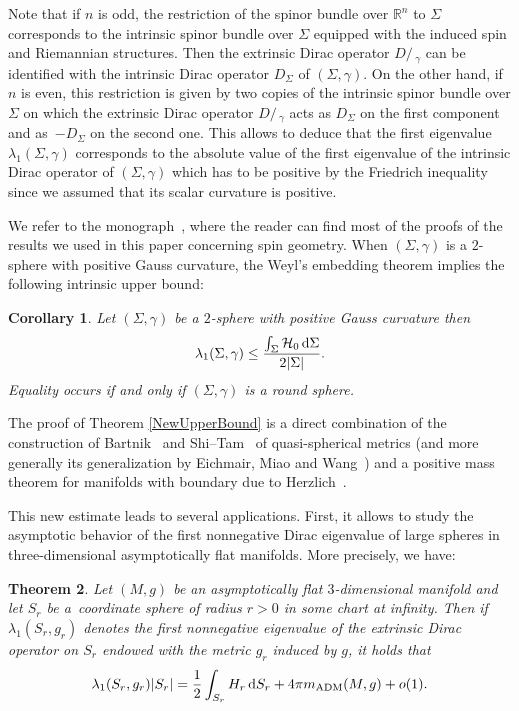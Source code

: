 \documentclass[10pt,a4paper]{amsart}
\numberwithin{equation}{section}
\newtheorem{Theorem}{Theorem}[section]
\newtheorem{Corollary}[Theorem]{Corollary}
\def\D{D\!\!\!\!/\,}
\begin{document}
Note that if $n$ is odd, the restriction of the spinor bundle over $\mathbb{R}^n$ to $\Sigma$ corresponds to the intrinsic spinor bundle over $\Sigma$ equipped with the induced spin and Riemannian structures. Then the extrinsic Dirac operator $\D_\gamma$ can be identified with the intrinsic Dirac operator $D_\Sigma$ of $(\Sigma,\gamma)$. On the other hand, if $n$ is even, this restriction is given by two copies of the intrinsic spinor bundle over $\Sigma$ on which the extrinsic Dirac operator $\D_\gamma$ acts as $D_\Sigma$ on the first component and as~$-D_\Sigma$ on the second one. This allows to deduce that the first eigenvalue $\lambda_1(\Sigma,\gamma)$ corresponds to the absolute value of the first eigenvalue of the intrinsic Dirac operator of $(\Sigma,\gamma)$ which has to be positive by the Friedrich inequality~\cite{Friedrich3} since we assumed that its scalar curvature is positive.

We refer to the monograph~\cite{BourguignonHijaziMilhoratMoroianu}, where the reader can find most of the proofs of the results we used in this paper concerning spin geometry. When $(\Sigma,\gamma)$ is a $2$-sphere with positive Gauss curvature, the Weyl's embedding theorem implies the following intrinsic upper bound:
\begin{Corollary}\label{2SphereDirac}
Let $(\Sigma,\gamma)$ be a $2$-sphere with positive Gauss curvature then
\begin{gather*}
\lambda_1(\Sigma,\gamma)\leq\frac{\int_\Sigma \mathcal{H}_0\,{\rm d}\Sigma}{2|\Sigma|}.
\end{gather*}
Equality occurs if and only if $(\Sigma,\gamma)$ is a round sphere.
\end{Corollary}
The proof of Theorem \ref{NewUpperBound} is a direct combination of the construction of Bartnik~\cite{Bartnik1} and Shi--Tam~\cite{ShiTam1} of quasi-spherical metrics (and more generally its generalization by Eichmair, Miao and Wang~\cite{EichmairMiaoWang}) and a positive mass theorem for manifolds with boundary due to Herzlich~\cite{Herzlich1,Herzlich2}.

This new estimate leads to several applications. First, it allows to study the asymptotic behavior of the first nonnegative Dirac eigenvalue of large spheres in three-dimensional asymptotically flat manifolds. More precisely, we have:

\begin{Theorem}\label{AsymptoticDiracSphere}
Let $(M,g)$ be an asymptotically flat $3$-dimensional manifold and let $S_r$ be a~coordinate sphere of radius $r>0$ in some chart at infinity. Then if $\lambda_1(S_r,g_r)$ denotes the first nonnegative eigenvalue of the extrinsic Dirac operator on $S_r$ endowed with the metric $g_r$ induced by $g$, it holds that
\begin{gather}\label{IntegralInequality1}
\lambda_1(S_r,g_r)|S_r|=\frac{1}{2}\int_{S_r} H_r\,{\rm d}S_{r}+4\pi m_{\rm ADM}(M,g)+o(1).
\end{gather}
\end{Theorem}
\end{document}
